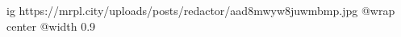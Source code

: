  
 
 
 
 

\ifcmt
  ig https://mrpl.city/uploads/posts/redactor/aad8mwyw8juwmbmp.jpg
  @wrap center
  @width 0.9
\fi
